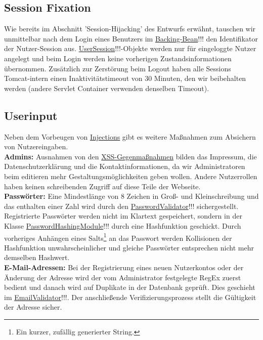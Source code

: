 \documentclass{article}
\begin{document}
\subsection{Session Fixation}
Wie bereits im Abschnitt 'Session-Hijacking' des Entwurfs erwähnt, tauschen wir unmittelbar nach dem Login eines Benutzers im \hyperlink{Login}{Backing-Bean}!!! den Identifikator der Nutzer-Session aus. \hyperlink{Session}{UserSession}!!!-Objekte werden nur für eingeloggte Nutzer angelegt und beim Login werden keine vorherigen Zustandsinformationen übernommen.  Zusätzlich zur Zerstörung beim Logout haben alle Sessions Tomcat-intern einen Inaktivitätstimeout von 30 Minuten, den wir beibehalten werden (andere Servlet Container verwenden denselben Timeout).
\subsection{Userinput}
Neben dem Vorbeugen von \hyperlink{Injections}{Injections} gibt es weitere Maßnahmen zum Absichern von Nutzereingaben.\\
\textbf{Admins:} Ausnahmen von den \hyperlink{XSS}{XSS-Gegenmaßnahmen} bilden das Impressum, die Datenschutzerklärung und  die Kontaktinformationen, da wir Administratoren beim editieren mehr Gestaltungsmöglichkeiten geben wollen. Andere Nutzerrollen haben keinen schreibenden Zugriff auf diese Teile der Webseite.\\
\textbf{Passwörter:} Eine Mindestlänge von 8 Zeichen in Groß- und Kleinschreibung und das enthalten einer Zahl wird durch den \hyperlink{Passwordvalidator}{PasswordValidator}!!! sichergestellt. Registrierte Passwörter werden nicht im Klartext gespeichert, sondern in der Klasse \hyperlink{Hash}{PasswordHashingModule}!!! durch eine Hashfunktion geschickt. Durch vorheriges Anhängen eines Salts\footnote{Ein kurzer, zufällig generierter String.} an das Passwort werden Kollisionen der Hashfunktion unwahrscheinlicher und gleiche Passwörter entsprechen nicht mehr demselben Hashwert.\\
\textbf{E-Mail-Adressen:} Bei der Registrierung eines neuen Nutzerkontos oder der Änderung der Adresse wird der vom Administrator festgelegte RegEx zuerst bedient und danach wird auf Duplikate in der Datenbank geprüft. Dies geschieht im \hyperlink{Emailvalidator}{EmailValidator}!!!. Der anschließende Verifizierungsprozess stellt die Gültigkeit der Adresse sicher.
\end{document}
